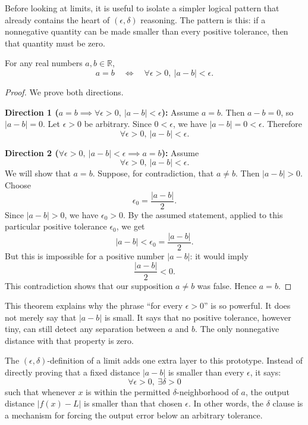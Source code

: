 \documentclass{essay}
\begin{document}
Before looking at limits, it is useful to isolate a simpler logical pattern that already contains the heart of $(\epsilon,\delta)$ reasoning. The pattern is this: if a nonnegative quantity can be made smaller than every positive tolerance, then that quantity must be zero.

\begin{theorem}
\label{thm:equality-by-arbitrary-precision}
For any real numbers $a,b \in \mathbb{R}$,
\[
a=b
\quad\Longleftrightarrow\quad
\forall \epsilon>0,\ |a-b|<\epsilon.
\]
\end{theorem}

\begin{proof}
We prove both directions.

\textbf{Direction 1 ($a=b \implies \forall \epsilon>0,\ |a-b|<\epsilon$):}
Assume $a=b$. Then $a-b=0$, so $|a-b|=0$. Let $\epsilon>0$ be arbitrary. Since $0<\epsilon$, we have $|a-b|=0<\epsilon$. Therefore
\[
\forall \epsilon>0,\ |a-b|<\epsilon.
\]

\textbf{Direction 2 ($\forall \epsilon>0,\ |a-b|<\epsilon \implies a=b$):}
Assume
\[
\forall \epsilon>0,\ |a-b|<\epsilon.
\]
We will show that $a=b$. Suppose, for contradiction, that $a\neq b$. Then $|a-b|>0$. Choose
\[
\epsilon_0=\frac{|a-b|}{2}.
\]
Since $|a-b|>0$, we have $\epsilon_0>0$. By the assumed statement, applied to this particular positive tolerance $\epsilon_0$, we get
\[
|a-b|<\epsilon_0=\frac{|a-b|}{2}.
\]
But this is impossible for a positive number $|a-b|$: it would imply
\[
\frac{|a-b|}{2}<0.
\]
This contradiction shows that our supposition $a\neq b$ was false. Hence $a=b$.
\end{proof}

This theorem explains why the phrase ``for every $\epsilon>0$'' is so powerful. It does not merely say that $|a-b|$ is small. It says that no positive tolerance, however tiny, can still detect any separation between $a$ and $b$. The only nonnegative distance with that property is zero.

The $(\epsilon,\delta)$-definition of a limit adds one extra layer to this prototype. Instead of directly proving that a fixed distance $|a-b|$ is smaller than every $\epsilon$, it says:
\[
\forall \epsilon>0,\ \exists \delta>0
\]
such that whenever $x$ is within the permitted $\delta$-neighborhood of $a$, the output distance $|f(x)-L|$ is smaller than that chosen $\epsilon$. In other words, the $\delta$ clause is a mechanism for forcing the output error below an arbitrary tolerance.
\end{document}
